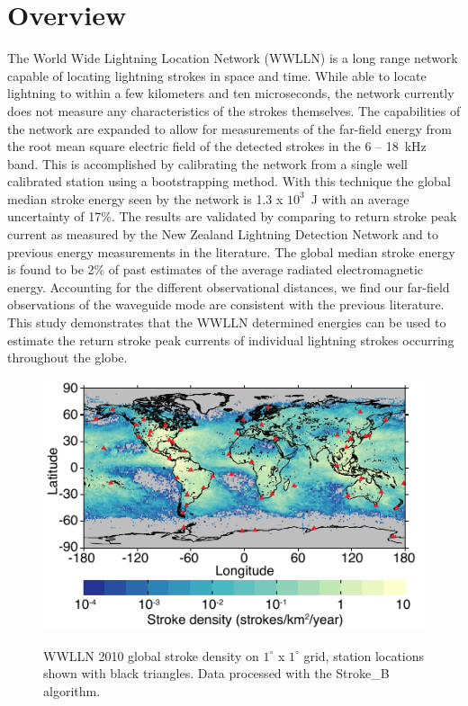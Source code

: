 \section{Overview}

The World Wide Lightning Location Network (WWLLN) is a long range network capable of locating lightning strokes in space and time.
While able to locate lightning to within a few kilometers and ten microseconds, the network currently does not measure any characteristics of the strokes themselves.
The capabilities of the network are expanded to allow for measurements of the far-field energy from the root mean square electric field of the detected strokes in the 6 -- 18~kHz band.
This is accomplished by calibrating the network from a single well calibrated station using a bootstrapping method.
With this technique the global median stroke energy seen by the network is 1.3 x $10^3$~J with an average uncertainty of 17\%.
The results are validated by comparing to return stroke peak current as measured by the New Zealand Lightning Detection Network and to previous energy measurements in the literature.
The global median stroke energy is found to be 2\% of past estimates of the average radiated electromagnetic energy.
Accounting for the different observational distances, we find our far-field observations of the waveguide mode are consistent with the previous literature.
This study demonstrates that the WWLLN determined energies can be used to estimate the return stroke peak currents of individual lightning strokes occurring throughout the globe.

\begin{figure}[ht!]
\centering
\includegraphics[scale=1.5]{energy/Figures/PPS_WWLLN_2010.pdf}\\
\caption{WWLLN 2010 global stroke density on $1^\circ$ x $1^\circ$ grid, station locations shown with black triangles. Data processed with the Stroke\_B algorithm.}
\label{energy:fig:wwlln_dist}
\end{figure}

